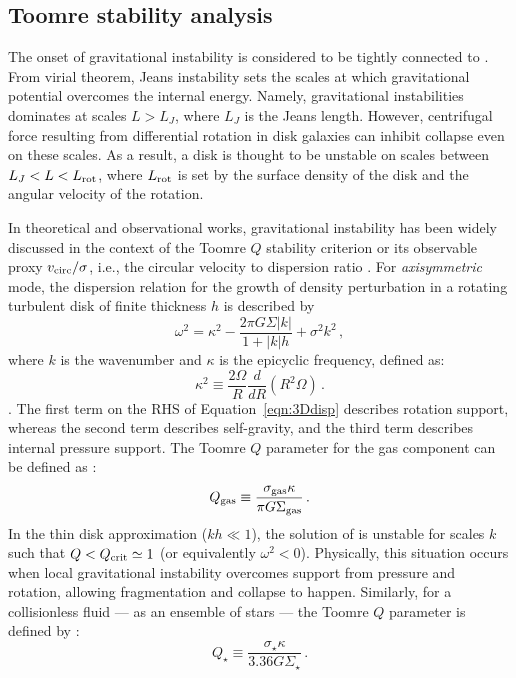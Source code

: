 \IfFileExists{emulateapjlegacy.cls}{\documentclass[iop]{emulateapjlegacy}}{\documentclass[iop]{emulateapj}}
\begin{document}
\subsection{Toomre stability analysis}\label{sec:Q}

The onset of gravitational instability is considered to be tightly connected to \SF \citep[e.g.,][]{Kennicutt89a, Wang94a, Li05b, Li06a}. From virial theorem, Jeans instability sets the scales at which gravitational potential overcomes the internal energy. Namely, gravitational instabilities dominates at scales $L > L_J$, where $L_J$ is the Jeans length. However, centrifugal force resulting from differential rotation in disk galaxies can inhibit collapse even on these scales. As a result, a disk is thought to be unstable on scales between $L_J < L < L_{\rm rot}$, where $L_{\rm rot}$ is set by the surface density of the disk and the angular velocity of the rotation.

In theoretical and observational works, gravitational instability has been widely discussed in the context of the Toomre $Q$ stability criterion \citep{Toomre64a, Goldreich65b} or its observable proxy  $v_{\rm circ}/\sigma$, i.e., the circular velocity to dispersion ratio \citep[e.g.,][]{GarciaBurillo03a, Genzel11a, Kassin12a, Leung19a}.
%
For {\it axisymmetric} mode, the dispersion relation for the growth of density perturbation in a rotating turbulent disk of finite thickness $h$ is described by
\begin{equation}
\omega^2 = \kappa^2 - \frac{2\pi G \Sigma |k|}{1 + |k| h} + \sigma^2 k^2\,,
\label{eqn:3Ddisp}
\end{equation}
where $k$ is the wavenumber and $\kappa$ is the epicyclic frequency, defined as:
\begin{equation}
\kappa^2\equiv\frac{2\Omega}{R}\frac{d}{dR}\left(R^2\Omega\right)\,.
\label{eqn:kappa}
\end{equation}
\citep{Romeo92a}.
The first term on the RHS of Equation~\ref{eqn:3Ddisp} describes rotation support, whereas the second term describes self-gravity, and the third term describes internal pressure support. The Toomre $Q$ parameter for the gas component can be defined as \citep{Toomre64a}:
\begin{equation}
Q_{\rm gas}\equiv\frac{\sigma_{\rm gas}\kappa}{\pi G \Sigma_{\rm gas}}\,.
\label{eqn:Q}
\end{equation}
In the thin disk approximation ($kh\ll1$), the solution of  is unstable for scales $k$ such that $Q < Q_{\rm crit}\simeq1$ (or equivalently $\omega^2 < 0$). Physically, this situation occurs when local gravitational instability
overcomes support from pressure and rotation, allowing fragmentation and collapse to happen. Similarly, for a collisionless fluid --- as an ensemble of stars --- the Toomre $Q$ parameter is defined by \citep{Toomre64a}:
\begin{equation}
Q_{\star} \equiv\frac{\sigma_{\star}\kappa}{3.36 G \Sigma_{\star}}\,.
\end{equation}
\end{document}
